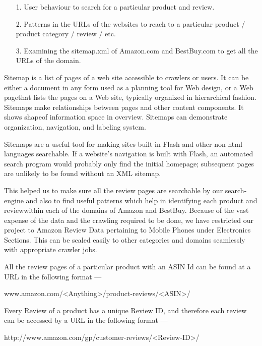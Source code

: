 \documentclass{article}
\begin{document}
\begin{enumerate}
	\item[1. ] User behaviour to search for a particular product and review.
	\item[2. ] Patterns in the URLs of the websites to reach to a particular product / product category / review / etc.
	\item[3. ] Examining the sitemap.xml of Amazon.com and BestBuy.com to get all the URLs of the domain.
\end{enumerate} 

Sitemap is a list of pages of a web site accessible to crawlers or users. It can be either a document in any form used as a planning tool for Web design, or a Web pagethat lists the pages on a Web site, typically organized in hierarchical fashion. Sitemaps make relationships between pages and other content components. It shows shapeof information space in overview. Sitemaps can demonstrate organization, navigation, and labeling system.

Sitemaps are a useful tool for making sites built in Flash and other non-html languages searchable. If a website's navigation is built with Flash, an automated search program would probably only find the initial homepage; subsequent pages are unlikely to be found without an XML sitemap.

This helped us to make sure all the review pages are searchable by our search-engine and also to find useful patterns which help in identifying each product and reviewwithin each of the domains of Amazon and BestBuy. Because of the vast expense of the data and the crawling required to be done, we have restricted our project to Amazon Review Data pertaining to Mobile Phones under Electronics Sections. This can be scaled easily to other categories and domains seamlessly with appropriate crawler jobs. 

All the review pages of a particular product with an ASIN Id can be found at a URL in the following format ---

\begin{center}
\label{sec:urlPattern}
	www.amazon.com/<Anything>/product-reviews/<ASIN>/
\end{center}

Every Review of a product has a unique Review ID, and therefore each review can be accessed by a URL in the following format ---
\begin{center}
	http://www.amazon.com/gp/customer-reviews/<Review-ID>/
\end{center}
\end{document}
